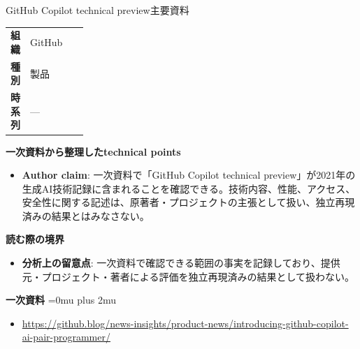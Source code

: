 \begin{technicalnote}{GitHub Copilot technical preview}{主要資料}
\begingroup
\begin{tabularx}{\linewidth}{@{}>{\bfseries}p{0.22\linewidth}X@{}}
組織 & GitHub \\
種別 & 製品 \\
時系列 & — \\
\end{tabularx}
\smallskip
{\bfseries 一次資料から整理したtechnical points}
\begin{itemize}[leftmargin=1.5em,itemsep=0.35em]
\item \textbf{Author claim}: 一次資料で「GitHub Copilot technical preview」が2021年の生成AI技術記録に含まれることを確認できる。技術内容、性能、アクセス、安全性に関する記述は、原著者・プロジェクトの主張として扱い、独立再現済みの結果とはみなさない。
\end{itemize}
\begin{minipage}{\linewidth}
{\bfseries 読む際の境界}
\begin{itemize}[leftmargin=1.5em,itemsep=0.35em]
\item \textbf{分析上の留意点}: 一次資料で確認できる範囲の事実を記録しており、提供元・プロジェクト・著者による評価を独立再現済みの結果として扱わない。
\end{itemize}
\begin{samepage}
{\bfseries 一次資料}
\begingroup\sloppy
\Urlmuskip=0mu plus 2mu\relax
\begin{itemize}[leftmargin=1.5em,itemsep=0.25em]
\item {\scriptsize\url{https://github.blog/news-insights/product-news/introducing-github-copilot-ai-pair-programmer/}}
\end{itemize}
\endgroup
\end{samepage}
\end{minipage}
\endgroup
\end{technicalnote}
\medskip
